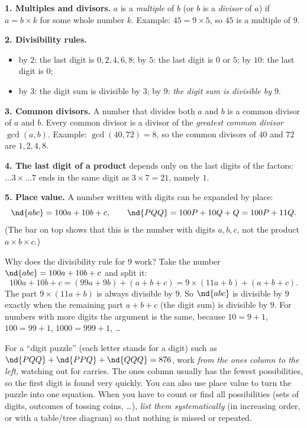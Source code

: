 \begin{knowbox}
\textbf{1. Multiples and divisors.} $a$ is a \emph{multiple} of $b$ (or $b$ is a \emph{divisor} of $a$) if
$a = b\times k$ for some whole number $k$. Example: $45 = 9\times 5$, so $45$ is a multiple of $9$.

\textbf{2. Divisibility rules.}
\begin{itemize}[leftmargin=1.4em,itemsep=1pt,topsep=2pt]
  \item by $2$: the last digit is $0, 2, 4, 6, 8$; \quad by $5$: the last digit is $0$ or $5$; \quad by $10$: the last digit is $0$;
  \item by $3$: the digit sum is divisible by $3$; \quad by $9$: \emph{the digit sum is divisible by $9$}.
\end{itemize}
\textbf{3. Common divisors.} A number that divides both $a$ and $b$ is a common divisor of $a$ and $b$. Every common divisor
is a divisor of the \emph{greatest common divisor} $\gcd(a,b)$. Example: $\gcd(40,72)=8$, so the common divisors of $40$
and $72$ are $1, 2, 4, 8$.

\textbf{4. The last digit of a product} depends only on the last digits of the factors:
$\ldots 3 \times \ldots 7$ ends in the same digit as $3\times 7 = 21$, namely $1$.

\textbf{5. Place value.} A number written with digits can be expanded by place:
\[ \nd{abc} = 100a + 10b + c, \qquad \nd{PQQ} = 100P + 10Q + Q = 100P + 11Q. \]
(The bar on top shows that this is the number with digits $a, b, c$, not the product $a\times b\times c$.)
\end{knowbox}
\begin{proofbox}
Why does the divisibility rule for $9$ work? Take the number $\nd{abc} = 100a + 10b + c$ and split it:
\[ 100a + 10b + c = (99a + 9b) + (a + b + c) = 9\times(11a + b) + (a+b+c). \]
The part $9\times(11a+b)$ is always divisible by $9$. So $\nd{abc}$ is divisible by $9$ exactly when the remaining part
$a+b+c$ (the digit sum) is divisible by $9$. For numbers with more digits the argument is the same, because
$10 = 9+1$, $100 = 99+1$, $1000 = 999+1$, \ldots
\end{proofbox}
\begin{tipbox}
For a ``digit puzzle'' (each letter stands for a digit) such as $\nd{PQQ}+\nd{PPQ}+\nd{QQQ}=876$, work \emph{from the ones
column to the left}, watching out for carries. The ones column usually has the fewest possibilities, so the first digit
is found very quickly. You can also use place value to turn the puzzle into one equation. When you have to count or find
all possibilities (sets of digits, outcomes of tossing coins, \ldots), \emph{list them systematically} (in increasing order,
or with a table/tree diagram) so that nothing is missed or repeated.
\end{tipbox}

